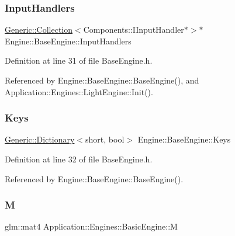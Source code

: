 \subsubsection{\texorpdfstring{Input\+Handlers}{InputHandlers}}
{\footnotesize\ttfamily \mbox{\hyperlink{classGeneric_1_1Collection}{Generic\+::\+Collection}}$<$Components\+::\+I\+Input\+Handler$\ast$$>$$\ast$ Engine\+::\+Base\+Engine\+::\+Input\+Handlers\hspace{0.3cm}{\ttfamily [inherited]}}



Definition at line 31 of file Base\+Engine.\+h.



Referenced by Engine\+::\+Base\+Engine\+::\+Base\+Engine(), and Application\+::\+Engines\+::\+Light\+Engine\+::\+Init().

\mbox{\label{classEngine_1_1BaseEngine_a65321a97e83f0a6ee90df3efac2d3307}} 
\subsubsection{\texorpdfstring{Keys}{Keys}}
{\footnotesize\ttfamily \mbox{\hyperlink{classGeneric_1_1Dictionary}{Generic\+::\+Dictionary}}$<$short, bool$>$ Engine\+::\+Base\+Engine\+::\+Keys\hspace{0.3cm}{\ttfamily [inherited]}}



Definition at line 32 of file Base\+Engine.\+h.



Referenced by Engine\+::\+Base\+Engine\+::\+Base\+Engine().

\mbox{\label{classApplication_1_1Engines_1_1BasicEngine_a645ebb7fc6a7eb2961a5c15986a0c246}} 
\subsubsection{\texorpdfstring{M}{M}}
{\footnotesize\ttfamily glm\+::mat4 Application\+::\+Engines\+::\+Basic\+Engine\+::M\hspace{0.3cm}{\ttfamily [private]}}




